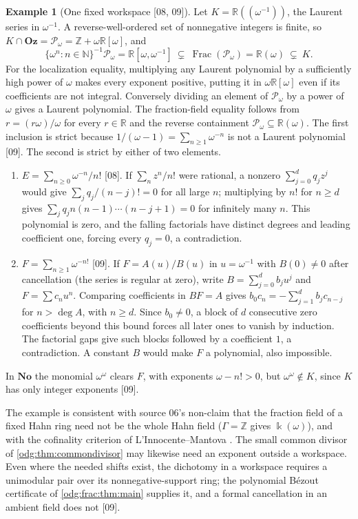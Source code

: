 \documentclass[11pt,oneside]{article}
\numberwithin{equation}{section}
\theoremstyle{definition}
\newtheorem{example}[example]{Example}
\theoremstyle{remark}
\newcommand{\No}{\mathbf{No}}
\newcommand{\Oz}{\mathbf{Oz}}
\newcommand{\Z}{\mathbb Z}
\newcommand{\R}{\mathbb R}
\newcommand{\N}{\mathbb N}
\newcommand{\Frac}{\operatorname{Frac}}
\newcommand{\src}[1]{\textup{\textsf{\small[#1]}}}
\newcommand{\Pmod}{\mathcal P}
\begin{document}
\begin{example}[One fixed workspace \src{08, 09}]\label{odg:frac:ex:workspace}
Let $K=\R((\omega^{-1}))$, the Laurent series in $\omega^{-1}$. A
reverse-well-ordered set of nonnegative integers is finite, so
$K\cap\Oz=\Pmod_\omega=\Z+\omega\R[\omega]$, and
\[
 \{\omega^n:n\in\N\}^{-1}\Pmod_\omega=\R[\omega,\omega^{-1}]
 \ \subsetneq\ \Frac(\Pmod_\omega)=\R(\omega)\ \subsetneq\ K .
\]
For the localization equality, multiplying any Laurent polynomial by a
sufficiently high power of $\omega$ makes every exponent positive,
putting it in $\omega\R[\omega]$ even if its coefficients are not integral.
Conversely dividing an element of $\Pmod_\omega$ by a power of $\omega$
gives a Laurent polynomial. The fraction-field equality follows from
$r=(r\omega)/\omega$ for every $r\in\R$ and the reverse containment
$\Pmod_\omega\subseteq\R(\omega)$.
The first inclusion is strict because $1/(\omega-1)=\sum_{n\ge1}\omega^{-n}$ is not
a Laurent polynomial \src{09}. The second is strict by either of two elements.
\begin{enumerate}[label=\textup{(\roman*)},leftmargin=*]
\item $E=\sum_{n\ge0}\omega^{-n}/n!$ \src{08}. If $\sum_nz^n/n!$ were rational, a
nonzero $\sum_{j=0}^dq_jz^j$ would give $\sum_jq_j/(n-j)!=0$ for all large $n$;
multiplying by $n!$ for $n\ge d$ gives
$\sum_jq_jn(n-1)\cdots(n-j+1)=0$ for infinitely many $n$.
This polynomial is zero, and the falling factorials have distinct degrees
and leading coefficient one, forcing every $q_j=0$, a contradiction.
\item $F=\sum_{n\ge1}\omega^{-n!}$ \src{09}. If $F=A(u)/B(u)$ in $u=\omega^{-1}$ with
$B(0)\ne0$ after cancellation (the series is regular at zero), write
$B=\sum_{j=0}^d b_j u^j$ and $F=\sum c_nu^n$. Comparing coefficients
in $BF=A$ gives
$b_0c_n=-\sum_{j=1}^d b_jc_{n-j}$ for $n>\deg A$, with $n\ge d$.
Since $b_0\ne0$, a block of $d$ consecutive zero coefficients beyond
this bound forces all later ones to vanish by induction. The factorial
gaps give such blocks followed by a coefficient $1$, a contradiction.
A constant $B$ would make $F$ a polynomial, also impossible.
\end{enumerate}
In $\No$ the monomial $\omega^\omega$ clears $F$, with exponents $\omega-n!>0$, but
$\omega^\omega\notin K$, since $K$ has only integer exponents \src{09}.
\end{example}

The example is consistent with source 06's non-claim that the fraction field of a
fixed Hahn ring need not be the whole Hahn field ($\Gamma=\Z$ gives
$\Bbbk(\omega)$), and with the cofinality criterion of L'Innocente--Mantova
\cite[Proposition 2.4.5]{LM}. The small common divisor of
\cref{odg:thm:commondivisor} may likewise need an exponent outside a workspace.
Even where the needed shifts exist, the dichotomy in a workspace requires a
unimodular pair over its nonnegative-support ring; the polynomial B\'ezout
certificate of \cref{odg:frac:thm:main} supplies it, and a formal cancellation in
an ambient field does not \src{09}.
\end{document}
